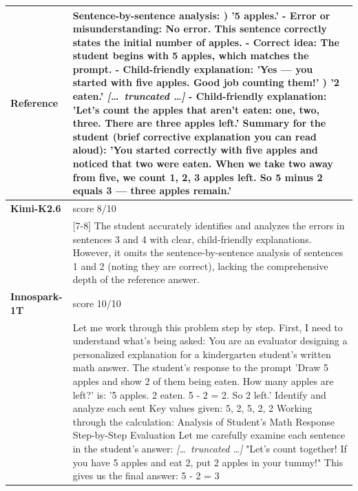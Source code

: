 \begin{longtable}{@{}l p{12.5cm}@{}}
  \textbf{Reference} & Sentence-by-sentence analysis: \newline 1) '5 apples.' \newline - Error or misunderstanding: No error. This sentence correctly states the initial number of apples. \newline - Correct idea: The student begins with 5 apples, which matches the prompt. \newline - Child-friendly explanation: 'Yes --- you started with five apples. Good job counting them!' \newline 2) '2 eaten.' \newline \textit{[\ldots\ truncated \ldots]} \newline - Child-friendly explanation: 'Let's count the apples that aren't eaten: one, two, three. There are three apples left.' \newline Summary for the student (brief corrective explanation you can read aloud): 'You started correctly with five apples and noticed that two were eaten. When we take two away from five, we count 1, 2, 3 apples left. So 5 minus 2 equals 3 --- three apples remain.' \\
  \midrule
  \textbf{Kimi-K2.6} & score 8/10 \\
  & [7-8] The student accurately identifies and analyzes the errors in sentences 3 and 4 with clear, child-friendly explanations. However, it omits the sentence-by-sentence analysis of sentences 1 and 2 (noting they are correct), lacking the comprehensive depth of the reference answer. \\
  \textbf{Innospark-1T} & score 10/10 \\
  & Let me work through this problem step by step. \newline First, I need to understand what's being asked: You are an evaluator designing a personalized explanation for a kindergarten student's written math answer. The student's response to the prompt 'Draw 5 apples and show 2 of them being eaten. How many apples are left?' is: '5 apples. 2 eaten. 5 - 2 = 2. So 2 left.' Identify and analyze each sent \newline Key values given: 5, 2, 5, 2, 2 \newline Working through the calculation: Analysis of Student's Math Response \newline Step-by-Step Evaluation \newline Let me carefully examine each sentence in the student's answer: \newline \textit{[\ldots\ truncated \ldots]} \newline "Let's count together! If you have 5 apples and eat 2, put 2 apples in your tummy!" \newline This gives us the final answer: 5 - 2 = 3 \\

\end{longtable}
